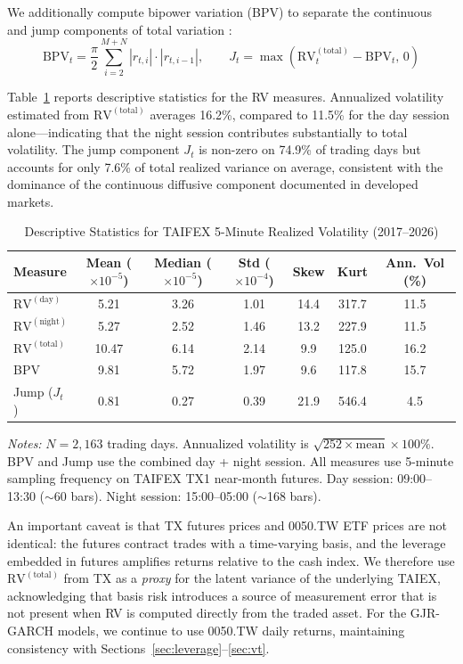 We additionally compute bipower variation (BPV) to separate the continuous and jump components of total variation \citep{barndorff2004}:
\begin{equation}
\text{BPV}_t = \frac{\pi}{2} \sum_{i=2}^{M+N} |r_{t,i}| \cdot |r_{t,i-1}|, \qquad
J_t = \max(\text{RV}_t^{(\text{total})} - \text{BPV}_t, \, 0)
\label{eq:bpv}
\end{equation}

Table~\ref{tab:rv_stats} reports descriptive statistics for the RV measures. Annualized volatility estimated from $\text{RV}^{(\text{total})}$ averages 16.2\%, compared to 11.5\% for the day session alone---indicating that the night session contributes substantially to total volatility. The jump component $J_t$ is non-zero on 74.9\% of trading days but accounts for only 7.6\% of total realized variance on average, consistent with the dominance of the continuous diffusive component documented in developed markets.

\begin{table}[H]
\centering
\caption{Descriptive Statistics for TAIFEX 5-Minute Realized Volatility (2017--2026)}
\label{tab:rv_stats}
\begin{tabular}{lcccccc}
\toprule
Measure & Mean ($\times 10^{-5}$) & Median ($\times 10^{-5}$) & Std ($\times 10^{-4}$) & Skew & Kurt & Ann.\ Vol (\%) \\
\midrule
$\text{RV}^{(\text{day})}$ & 5.21 & 3.26 & 1.01 & 14.4 & 317.7 & 11.5 \\
$\text{RV}^{(\text{night})}$ & 5.27 & 2.52 & 1.46 & 13.2 & 227.9 & 11.5 \\
$\text{RV}^{(\text{total})}$ & 10.47 & 6.14 & 2.14 & 9.9 & 125.0 & 16.2 \\
BPV & 9.81 & 5.72 & 1.97 & 9.6 & 117.8 & 15.7 \\
Jump ($J_t$) & 0.81 & 0.27 & 0.39 & 21.9 & 546.4 & 4.5 \\
\bottomrule
\end{tabular}
\begin{flushleft}
\small \textit{Notes:} $N = 2{,}163$ trading days. Annualized volatility is $\sqrt{252 \times \text{mean}} \times 100\%$. BPV and Jump use the combined day + night session. All measures use 5-minute sampling frequency on TAIFEX TX1 near-month futures. Day session: 09:00--13:30 ($\sim$60 bars). Night session: 15:00--05:00 ($\sim$168 bars).
\end{flushleft}
\end{table}

An important caveat is that TX futures prices and 0050.TW ETF prices are not identical: the futures contract trades with a time-varying basis, and the leverage embedded in futures amplifies returns relative to the cash index. We therefore use $\text{RV}^{(\text{total})}$ from TX as a \textit{proxy} for the latent variance of the underlying TAIEX, acknowledging that basis risk introduces a source of measurement error that is not present when RV is computed directly from the traded asset. For the GJR-GARCH models, we continue to use 0050.TW daily returns, maintaining consistency with Sections~\ref{sec:leverage}--\ref{sec:vt}.



